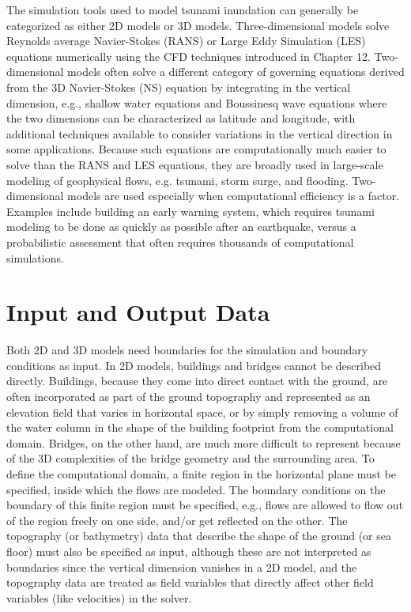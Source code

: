 The simulation tools used to model tsunami inundation can generally be categorized as either 2D models or 3D models. Three-dimensional models solve Reynolds average Navier-Stokes (RANS) or Large Eddy Simulation (LES) equations numerically using the CFD techniques introduced in Chapter 12. Two-dimensional models often solve a different category of governing equations derived from the 3D Navier-Stokes (NS) equation by integrating in the vertical dimension, e.g., shallow water equations and Boussinesq wave equations where the two dimensions can be characterized as latitude and longitude, with additional techniques available to consider variations in the vertical direction in some applications. Because such equations are computationally much easier to solve than the RANS and LES equations, they are broadly used in large-scale modeling of geophysical flows, e.g. tsunami, storm surge, and flooding. Two-dimensional models are used especially when computational efficiency is a factor. Examples include building an early warning system, which requires tsunami modeling to be done as quickly as possible after an earthquake, versus a probabilistic assessment that often requires thousands of computational simulations.

\section{Input and Output Data}
\label{sec:tsunami_io}

Both 2D and 3D models need boundaries for the simulation and boundary conditions as input. In 2D models, buildings and bridges cannot be described directly.  Buildings, because they come into direct contact with the ground, are often incorporated as part of the ground topography and represented as an elevation field that varies in horizontal space, or by simply removing a volume of the water column in the shape of the building footprint from the computational domain. Bridges, on the other hand, are much more difficult to represent because of the 3D complexities of the bridge geometry and the surrounding area.  To define the computational domain, a finite region in the horizontal plane must be specified, inside which the flows are modeled. The boundary conditions on the boundary of this finite region must be specified, e.g., flows are allowed to flow out of the region freely on one side, and/or get reflected on the other. The topography (or bathymetry) data that describe the shape of the ground (or sea floor) must also be specified as input, although these are not interpreted as boundaries since the vertical dimension vanishes in a 2D model, and the topography data are treated as field variables that directly affect other field variables (like velocities) in the solver.

